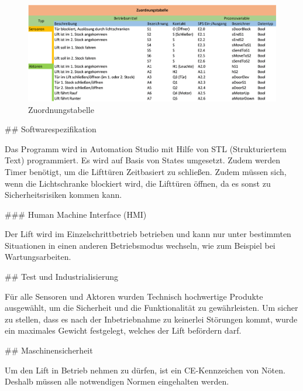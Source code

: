 \begin{markdown}
\begin{figure}[h!]
    \centering
    \includegraphics[width=\textwidth]{./images/Zuordnungstabelle.png}
    \caption[Zuordnungstabelle]{Zuordnungstabelle}
\end{figure}

## Softwarespezifikation

Das Programm wird in Automation Studio mit Hilfe von STL (Strukturiertem Text) programmiert. Es wird auf Basis von States umgesetzt. Zudem werden Timer benötigt, um die Lifttüren Zeitbasiert zu schließen. Zudem müssen sich, wenn die Lichtschranke blockiert wird, die Lifttüren öffnen, da es sonst zu Sicherheitsrisiken kommen kann. 

### Human Machine Interface (HMI)

Der Lift wird im Einzelschrittbetrieb betrieben und kann nur unter bestimmten Situationen in einen anderen Betriebsmodus wechseln, wie zum Beispiel bei Wartungsarbeiten.

## Test und Industrialisierung

Für alle Sensoren und Aktoren wurden Technisch hochwertige Produkte ausgewählt, um die Sicherheit und die Funktionalität zu gewährleisten. Um sicher zu stellen, dass es nach der Inbetriebnahme zu keinerlei Störungen kommt, wurde ein maximales Gewicht festgelegt, welches der Lift befördern darf.

## Maschinensicherheit

Um den Lift in Betrieb nehmen zu dürfen, ist ein CE-Kennzeichen von Nöten. Deshalb müssen alle notwendigen Normen eingehalten werden.
\end{markdown}

